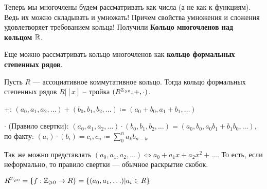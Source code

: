 Теперь мы многочлены будем рассматривать как числа (а не как к функциям). Ведь их можно складывать и умножать! Причем свойства умножения и сложения удовлетворяет требованием кольца! Получили \textbf{Кольцо многочленов над кольцом $\mathbb{R}$}.

Еще можно рассматривать кольцо многочленов как \textbf{кольцо формальных степенных рядов}.
\begin{definition}
    Пусть $R$ --- ассоциативное коммутативное кольцо. Тогда кольцо формальных степенных рядов  $R[[x]$ -- тройка  $(R^{\mathbb{Z}_{\geqslant 0}}, +, \cdot)$.

    $+$: $(a_0, a_1, a_2, \ldots) +  (b_0, b_1, b_2, \ldots) \coloneqq (a_0 + b_0, a_1 + b_1, \ldots)$

    $\cdot$ (Правило свертки):  $(a_0, a_1, a_2,\ldots) \cdot (b_0, b_1,b_2,\ldots) = (a_0, b_0, a_0b_1+b_1b_0,\ldots)$, по факту: $(a_i)\cdot(b_i) = c_i, c_n \coloneqq  \sum_0^n a_kb_{n-k}$

    Так же можно представлять $(a_0, a_1, a_2,\ldots) \iff a_0 + a_1x + a_2x^2+\ldots$. То есть, если неформально, то правило свертки --- обычное раскрытие скобок.
\end{definition}
\begin{definition}
    $R^{\mathbb{Z}_{\geqslant 0}} = \{ f: \mathbb{Z}_{\geqslant 0} \to R\} = \{(a_0, a_1, \ldots) | a_i \in R\}$
\end{definition}

